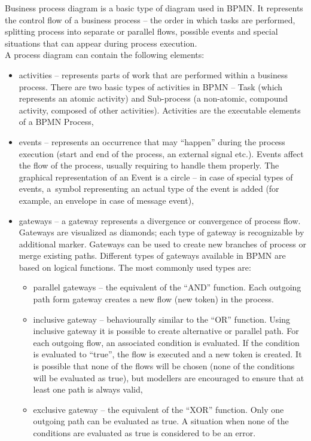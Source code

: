 Business process diagram is a basic type of diagram used in BPMN. It represents the control flow of a business process -- the order in which tasks are performed, splitting process into separate or parallel flows, possible events and special situations that can appear during process execution.\\
A process diagram can contain the following elements:
\begin{itemize}
	\item activities -- represents parts of work that are performed within a business process. There are two basic types of activities in BPMN -- Task (which represents an atomic activity) and Sub-process (a non-atomic, compound activity, composed of other activities). Activities are the executable elements of a BPMN Process,
	\item events -- represents an occurrence that may “happen” during the process execution (start and end of the process, an external signal etc.). Events affect the flow of the process, usually requiring to handle them properly. The graphical representation of an Event is a circle -- in case of special types of events, a~symbol representing an actual type of the event is added (for example, an envelope in case of message event),
	\item gateways -- a gateway represents a divergence or convergence of process flow. Gateways are visualized as diamonds; each type of gateway is recognizable by additional marker. Gateways can be used to create new branches of process or merge existing paths. Different types of gateways available in BPMN are based on logical functions. The most commonly used types are:
	\begin{itemize}
		\item parallel gateways -- the equivalent of the ``AND'' function. Each outgoing path form gateway creates a new flow (new token) in the process.
		\item inclusive gateway -- behaviourally similar to the ``OR'' function. Using inclusive gateway it is possible to create alternative or parallel path. For each outgoing flow, an associated condition is evaluated. If the condition is evaluated to ``true'', the flow is executed and a new token is created. It is possible that none of the flows will be chosen (none of the conditions will be evaluated as true), but modellers are encouraged to ensure that at least one path is always valid,
		\item exclusive gateway -- the equivalent of the ``XOR'' function. Only one outgoing path can be evaluated as true. A situation when none of the conditions are evaluated as true is considered to be an error.

\end{itemize}
\end{itemize}
